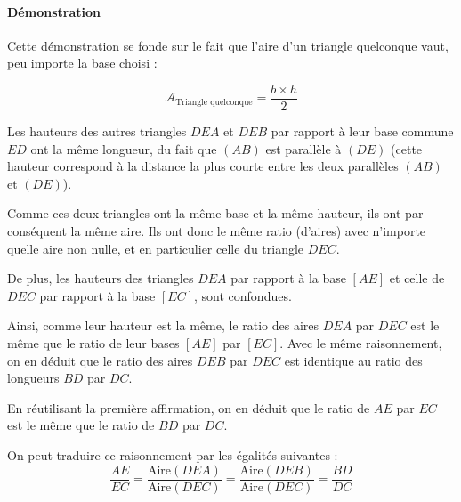 \documentclass[a4paper, twoside]{article}
\begin{document}
\paragraph*{Démonstration}

Cette démonstration se fonde sur le fait que l'aire
d'un triangle quelconque vaut,
peu importe la base choisi :

$$ \mathcal{A}_{\text{Triangle quelconque}} = \frac{b \times h}{2} $$

Les hauteurs des autres triangles $DEA$ et $DEB$ par rapport à
leur base commune $ED$ ont la même longueur,
du fait que $(AB)$ est parallèle à $(DE)$
(cette hauteur correspond à la distance la plus courte
entre les deux parallèles $(AB)$ et $(DE)$).

Comme ces deux triangles ont la même base et la même hauteur,
ils ont par conséquent la même aire.
Ils ont donc le même ratio (d'aires) avec n'importe quelle aire non nulle,
et en particulier celle du triangle $DEC$.

\medbreak

De plus, les hauteurs des triangles
$DEA$ par rapport à la base $[AE]$ et
celle de $DEC$ par rapport à la base $[EC]$,
sont confondues.

Ainsi, comme leur hauteur est la même,
le ratio des aires $DEA$ par $DEC$ est le même que
le ratio de leur bases $[AE]$ par $[EC]$.
Avec le même raisonnement, on en déduit que
le ratio des aires $DEB$ par $DEC$ est identique
au ratio des longueurs $BD$ par $DC$.

\medbreak

En réutilisant la première affirmation,
on en déduit que
le ratio de $AE$ par $EC$ est le même que
le ratio de $BD$ par $DC$.

\medbreak

On peut traduire ce raisonnement par les égalités suivantes :
$$\frac{AE}{EC} = \frac{{\text{Aire}}(DEA)}{{\text{Aire}}(DEC)}
	= \frac{{\text{Aire}}(DEB)}{{\text{Aire}}(DEC)}
	= \frac{BD}{DC}$$

\medbreak
\end{document}
